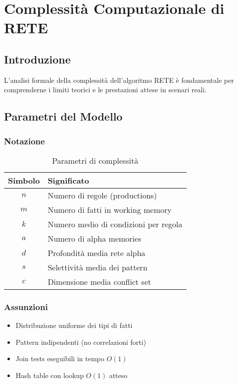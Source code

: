 
\chapter{Complessità Computazionale di RETE}
\label{cap:rete_complessita}

\section{Introduzione}

L'analisi formale della complessità dell'algoritmo RETE è fondamentale per comprenderne i limiti teorici e le prestazioni attese in scenari reali.

\section{Parametri del Modello}

\subsection{Notazione}

\begin{table}[h]
\centering
\begin{tabular}{@{}cl@{}}
\toprule
\textbf{Simbolo} & \textbf{Significato} \\
\midrule
$n$ & Numero di regole (productions) \\
$m$ & Numero di fatti in working memory \\
$k$ & Numero medio di condizioni per regola \\
$a$ & Numero di alpha memories \\
$d$ & Profondità media rete alpha \\
$s$ & Selettività media dei pattern \\
$c$ & Dimensione media conflict set \\
\bottomrule
\end{tabular}
\caption{Parametri di complessità}
\end{table}

\subsection{Assunzioni}

\begin{itemize}
\item Distribuzione uniforme dei tipi di fatti
\item Pattern indipendenti (no correlazioni forti)
\item Join tests eseguibili in tempo $O(1)$
\item Hash table con lookup $O(1)$ atteso
\end{itemize}

